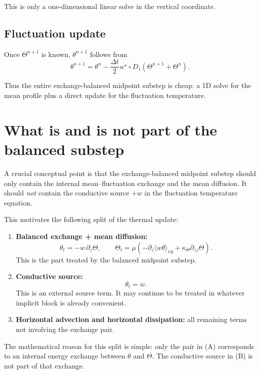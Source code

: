 \documentclass[11pt]{article}
\begin{document}
This is only a one-dimensional linear solve in the vertical coordinate.

\subsection{Fluctuation update}

Once $\Theta^{n+1}$ is known, $\theta^{n+1}$ follows from
\begin{equation}
\theta^{n+1}
=
\theta^n
-
\frac{\Delta t}{2}
w^\star \circ
D_1(\Theta^{n+1}+\Theta^n).
\label{eq:theta-update-final}
\end{equation}

Thus the entire exchange-balanced midpoint substep is cheap: a 1D solve for the mean profile plus a direct update for the fluctuation temperature.

\section{What is and is not part of the balanced substep}

A crucial conceptual point is that the exchange-balanced midpoint substep should only contain the internal mean--fluctuation exchange and the mean diffusion. It should \emph{not} contain the conductive source $+w$ in the fluctuation temperature equation.

This motivates the following split of the thermal update:

\begin{enumerate}[label=(\Alph*)]
\item \textbf{Balanced exchange + mean diffusion:}
\[
\theta_t = -w\,\partial_z\Theta,
\qquad
\Theta_t = \mu(-\partial_z\langle w\theta\rangle_{xy} + \kappa_\Theta \partial_{zz}\Theta).
\]
This is the part treated by the balanced midpoint substep.

\item \textbf{Conductive source:}
\[
\theta_t = w.
\]
This is an external source term. It may continue to be treated in whatever implicit block is already convenient.

\item \textbf{Horizontal advection and horizontal dissipation:}
all remaining terms not involving the exchange pair.
\end{enumerate}

The mathematical reason for this split is simple: only the pair in (A) corresponds to an internal energy exchange between $\theta$ and $\Theta$. The conductive source in (B) is not part of that exchange.
\end{document}
